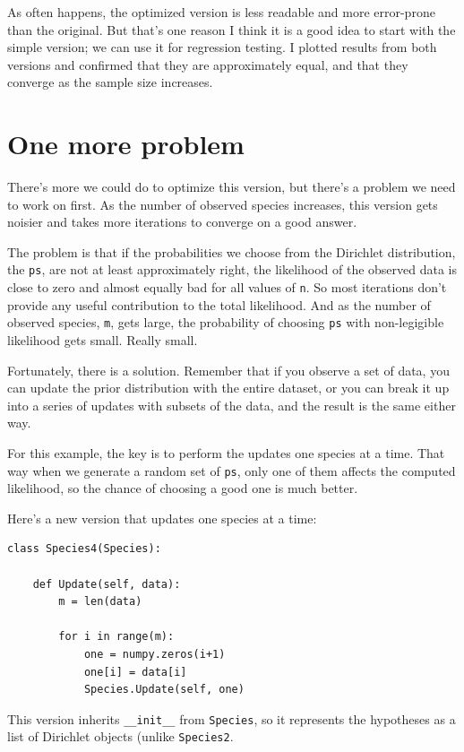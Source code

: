 \documentclass[12pt]{book}
\begin{document}
As often happens, the optimized version is less readable and more
error-prone than the original.  But that's one reason I think it is
a good idea to start with the simple version; we can use it for
regression testing.  I plotted results from both versions and confirmed
that they are approximately equal, and that they converge as the
sample size increases.


\section{One more problem}

There's more we could do to optimize this version, but there's a 
problem we need to work on first.  As the number of observed
species increases, this version gets noisier and takes more
iterations to converge on a good answer.

The problem is that if the probabilities we choose from the Dirichlet
distribution, the {\tt ps}, are not at least approximately right,
the likelihood of the observed data is close to zero and almost
equally bad for all values of {\tt n}.  So most iterations don't
provide any useful contribution to the total likelihood.  And as the
number of observed species, {\tt m}, gets large, the probability of
choosing {\tt ps} with non-legigible likelihood gets small.  Really
small.

Fortunately, there is a solution.  Remember that if you observe
a set of data, you can update the prior distribution with the
entire dataset, or you can break it up into a series of updates
with subsets of the data, and the result is the same either way.

For this example, the key is to perform the updates one species at
a time.  That way when we generate a random set of {\tt ps}, only
one of them affects the computed likelihood, so the chance of choosing
a good one is much better.

Here's a new version that updates one species at a time:

\begin{verbatim}
class Species4(Species):

    def Update(self, data):
        m = len(data)

        for i in range(m):
            one = numpy.zeros(i+1)
            one[i] = data[i]            
            Species.Update(self, one)
\end{verbatim}

This version inherits \verb"__init__" from {\tt Species}, so it
represents the hypotheses as a list of Dirichlet objects (unlike
{\tt Species2}.
\end{document}
